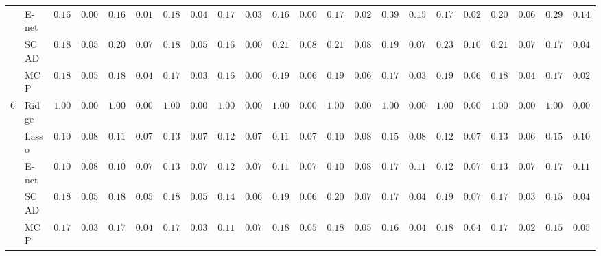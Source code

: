 \begin{tabular}{ll|ll|llllll|llllll|llllll}
 & E-net  & $0.1667$ & $0.0000$ & $0.1683$ & $0.0167$ & $0.1817$ & $0.0479$ & $0.1750$ & $0.0365$ & $0.1667$ & $0.0000$ & $0.1700$ & $0.0235$ & $0.3983$ & $0.1551$ & $0.1717$ & $0.0286$ & $0.2017$ & $0.0682$ & $0.2950$ & $0.1418$ \\
 & SCAD  & $0.1883$ & $0.0563$ & $0.2033$ & $0.0733$ & $0.1867$ & $0.0544$ & $0.1667$ & $0.0000$ & $0.2167$ & $0.0838$ & $0.2133$ & $0.0857$ & $0.1967$ & $0.0726$ & $0.2300$ & $0.1080$ & $0.2167$ & $0.0768$ & $0.1750$ & $0.0435$ \\
 & MCP  & $0.1850$ & $0.0524$ & $0.1817$ & $0.0479$ & $0.1767$ & $0.0398$ & $0.1667$ & $0.0000$ & $0.1950$ & $0.0672$ & $0.1950$ & $0.0672$ & $0.1733$ & $0.0328$ & $0.1983$ & $0.0699$ & $0.1817$ & $0.0479$ & $0.1717$ & $0.0286$ \\\hline
6 & Ridge  & $1.0000$ & $0.0000$ & $1.0000$ & $0.0000$ & $1.0000$ & $0.0000$ & $1.0000$ & $0.0000$ & $1.0000$ & $0.0000$ & $1.0000$ & $0.0000$ & $1.0000$ & $0.0000$ & $1.0000$ & $0.0000$ & $1.0000$ & $0.0000$ & $1.0000$ & $0.0000$ \\
 & Lasso  & $0.1050$ & $0.0809$ & $0.1100$ & $0.0793$ & $0.1317$ & $0.0760$ & $0.1200$ & $0.0752$ & $0.1167$ & $0.0768$ & $0.1017$ & $0.0817$ & $0.1567$ & $0.0881$ & $0.1233$ & $0.0735$ & $0.1350$ & $0.0699$ & $0.1550$ & $0.1012$ \\
 & E-net  & $0.1033$ & $0.0813$ & $0.1083$ & $0.0799$ & $0.1300$ & $0.0771$ & $0.1267$ & $0.0715$ & $0.1150$ & $0.0775$ & $0.1000$ & $0.0821$ & $0.1783$ & $0.1142$ & $0.1217$ & $0.0744$ & $0.1350$ & $0.0738$ & $0.1733$ & $0.1134$ \\
 & SCAD  & $0.1850$ & $0.0524$ & $0.1850$ & $0.0524$ & $0.1867$ & $0.0544$ & $0.1400$ & $0.0658$ & $0.1967$ & $0.0644$ & $0.2000$ & $0.0749$ & $0.1750$ & $0.0435$ & $0.1967$ & $0.0726$ & $0.1750$ & $0.0365$ & $0.1550$ & $0.0427$ \\
 & MCP  & $0.1750$ & $0.0365$ & $0.1783$ & $0.0427$ & $0.1733$ & $0.0328$ & $0.1167$ & $0.0768$ & $0.1883$ & $0.0563$ & $0.1850$ & $0.0524$ & $0.1617$ & $0.0440$ & $0.1817$ & $0.0479$ & $0.1717$ & $0.0286$ & $0.1500$ & $0.0503$ \\
\hline 
\end{tabular}

